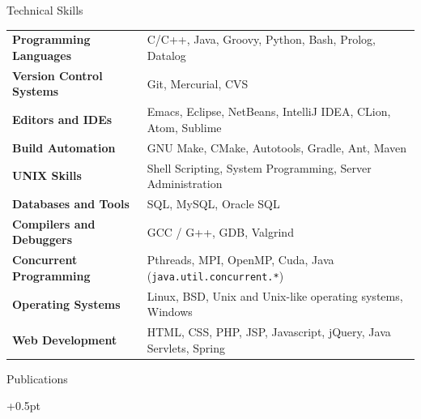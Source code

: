 \documentclass{resume}
\begin{document}
\begin{rSection}{Technical Skills}

{\renewcommand{\arraystretch}{1.3}
\begin{tabular}{ @{} >{\bfseries}l @{\hspace{6ex}} l }

Programming Languages
& C/C++, Java, Groovy, Python, Bash, Prolog, Datalog \\

Version Control Systems
   & Git, Mercurial, CVS \\

Editors and IDEs
   & Emacs, Eclipse, NetBeans, IntelliJ IDEA, CLion, Atom, Sublime \\

Build Automation
   & GNU Make, CMake, Autotools, Gradle, Ant, Maven \\

UNIX Skills
   & Shell Scripting, System Programming, Server Administration \\

Databases and Tools
   & SQL, MySQL, Oracle SQL \\

Compilers and Debuggers
   & GCC / G++, GDB, Valgrind \\

Concurrent Programming
   & Pthreads, MPI, OpenMP, Cuda, Java (\texttt{java.util.concurrent.*}) \\

Operating Systems
   & Linux, BSD, Unix and Unix-like operating systems, Windows \\


Web Development
   & HTML, CSS, PHP, JSP, Javascript, jQuery, Java Servlets, Spring \\

\end{tabular}}
\end{rSection}


\begin{rSection}{Publications}
  \begin{rSubsection}{}{}{}{}
    \itemsep +0.5pt %
  \item {}
  \end{rSubsection}
\end{rSection}
\end{document}
